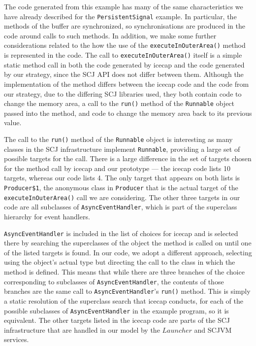 The code generated from this example has many of the same
characteristics we have already described for the
\texttt{PersistentSignal} example.
In particular, the methods of the buffer are synchronized, so
synchronisations are produced in the code around calls to such
methods.
In addition, we make some further considerations related to the how
the use of the \texttt{executeInOuterArea()} method is represented in
the code.
The call to \texttt{executeInOuterArea()} itself is a simple static
method call in both the code generated by icecap and the code
generated by our strategy, since the SCJ API does not differ between
them.
Although the implementation of the method differs between the icecap
code and the code from our strategy, due to the differing SCJ
libraries used, they both contain code to change the memory area, a
call to the \texttt{run()} method of the \texttt{Runnable} object
passed into the method, and code to change the memory area back to its
previous value.

The call to the \texttt{run()} method of the \texttt{Runnable} object
is interesting as many classes in the SCJ infrastructure implement
\texttt{Runnable}, providing a large set of possible targets for the
call.
There is a large difference in the set of targets chosen for the
method call by icecap and our prototype --- the icecap code lists 10
targets, whereas our code lists 4.
The only target that appears on both lists is \texttt{Producer\$1},
the anonymous class in \texttt{Producer} that is the actual target of
the \texttt{executeInOuterArea()} call we are considering.
The other three targets in our code are all subclasses of
\texttt{AsyncEventHandler}, which is part of the superclass hierarchy
for event handlers. 

\texttt{AsyncEventHandler} is included in the list of choices for
icecap and is selected there by searching the superclasses of the
object the method is called on until one of the listed targets is
found.
In our code, we adopt a different approach, selecting using the
object's actual type but directing the call to the class in which the
method is defined.
This means that while there are three branches of the choice
corresponding to subclasses of \texttt{AsyncEventHandler}, the
contents of those branches are the same call to
\texttt{AsyncEventHandler}'s \texttt{run()} method.
This is simply a static resolution of the superclass search that
icecap conducts, for each of the possible subclasses of
\texttt{AsyncEventHandler} in the example program, so it is
equivalent.
The other targets listed in the icecap code are parts of the SCJ
infrastructure that are handled in our model by the $Launcher$ and
SCJVM services.

